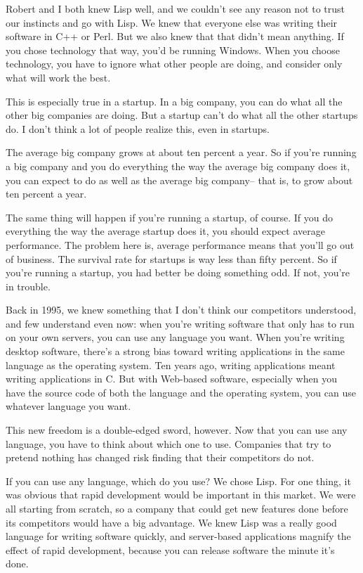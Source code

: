 \documentclass[12pt]{book}
\begin{document}
Robert and I both knew Lisp well, and we couldn't see any reason not to
trust our instincts and go with Lisp. We knew that everyone else was
writing their software in C++ or Perl. But we also knew that that didn't
mean anything. If you chose technology that way, you'd be running
Windows. When you choose technology, you have to ignore what other
people are doing, and consider only what will work the best.

This is especially true in a startup. In a big company, you can do what
all the other big companies are doing. But a startup can't do what all
the other startups do. I don't think a lot of people realize this, even
in startups.

The average big company grows at about ten percent a year. So if you're
running a big company and you do everything the way the average big
company does it, you can expect to do as well as the average big
company-- that is, to grow about ten percent a year.

The same thing will happen if you're running a startup, of course. If
you do everything the way the average startup does it, you should expect
average performance. The problem here is, average performance means that
you'll go out of business. The survival rate for startups is way less
than fifty percent. So if you're running a startup, you had better be
doing something odd. If not, you're in trouble.

Back in 1995, we knew something that I don't think our competitors
understood, and few understand even now: when you're writing software
that only has to run on your own servers, you can use any language you
want. When you're writing desktop software, there's a strong bias toward
writing applications in the same language as the operating system. Ten
years ago, writing applications meant writing applications in C. But
with Web-based software, especially when you have the source code of
both the language and the operating system, you can use whatever
language you want.

This new freedom is a double-edged sword, however. Now that you can use
any language, you have to think about which one to use. Companies that
try to pretend nothing has changed risk finding that their competitors
do not.

If you can use any language, which do you use? We chose Lisp. For one
thing, it was obvious that rapid development would be important in this
market. We were all starting from scratch, so a company that could get
new features done before its competitors would have a big advantage. We
knew Lisp was a really good language for writing software quickly, and
server-based applications magnify the effect of rapid development,
because you can release software the minute it's done.
\end{document}
